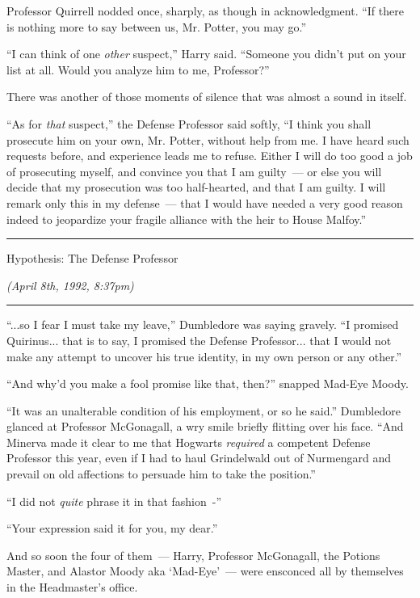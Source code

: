 Professor Quirrell nodded once, sharply, as though in acknowledgment. ``If there is nothing more to say between us, Mr. Potter, you may go.''

``I can think of one \emph{other} suspect,'' Harry said. ``Someone you didn't put on your list at all. Would you analyze him to me, Professor?''

There was another of those moments of silence that was almost a sound in itself.

``As for \emph{that} suspect,'' the Defense Professor said softly, ``I think you shall prosecute him on your own, Mr. Potter, without help from me. I have heard such requests before, and experience leads me to refuse. Either I will do too good a job of prosecuting myself, and convince you that I am guilty~--- or else you will decide that my prosecution was too half-hearted, and that I am guilty. I will remark only this in my defense~--- that I would have needed a very good reason indeed to jeopardize your fragile alliance with the heir to House Malfoy.''

\begin{center}\rule{3in}{0.4pt}\end{center}

Hypothesis: The Defense Professor

\emph{(April 8th, 1992, 8:37pm)}

\begin{center}\rule{3in}{0.4pt}\end{center}

``...so I fear I must take my leave,'' Dumbledore was saying gravely. ``I promised Quirinus... that is to say, I promised the Defense Professor... that I would not make any attempt to uncover his true identity, in my own person or any other.''

``And why'd you make a fool promise like that, then?'' snapped Mad-Eye Moody.

``It was an unalterable condition of his employment, or so he said.'' Dumbledore glanced at Professor McGonagall, a wry smile briefly flitting over his face. ``And Minerva made it clear to me that Hogwarts \emph{required} a competent Defense Professor this year, even if I had to haul Grindelwald out of Nurmengard and prevail on old affections to persuade him to take the position.''

``I did not \emph{quite} phrase it in that fashion~-''

``Your expression said it for you, my dear.''

And so soon the four of them~--- Harry, Professor McGonagall, the Potions Master, and Alastor Moody aka `Mad-Eye'~--- were ensconced all by themselves in the Headmaster's office.

